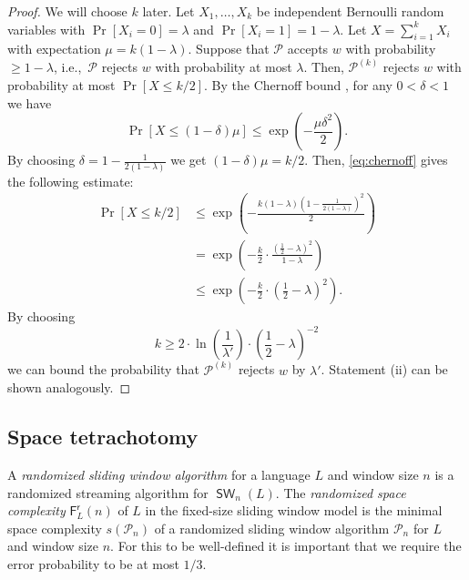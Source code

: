 \documentclass{article}\usepackage[a4paper,margin=20mm]{geometry}
\renewcommand{\P}{\mathcal{P}}
\newcommand{\F}{\mathsf{F}}
\renewcommand{\r}{\mathsf{r}}
\DeclareMathOperator{\SW}{\mathsf{SW}}
\renewcommand{\geq}{\geqslant}
\renewcommand{\leq}{\leqslant}
\renewcommand{\ge}{\geq}
\renewcommand{\le}{\leq}
\begin{document}
\begin{proof}
	We will choose $k$ later.
	Let $X_1, \dots, X_k$ be independent Bernoulli random variables
	with $\Pr[X_i = 0] = \lambda$ and $\Pr[X_i = 1] = 1-\lambda$.
	Let $X = \sum_{i=1}^k X_i$ with expectation $\mu = k (1-\lambda)$.
	Suppose that $\P$ accepts $w$ with probability $\ge 1-\lambda$,
	i.e.,~$\P$ rejects $w$ with probability at most $\lambda$.
	Then, $\P^{(k)}$ rejects $w$ with probability at most $\Pr[X \le k/2]$.
	By the Chernoff bound \cite[Theorem~4.5]{MitzenmacherU17},
	for any $0 < \delta < 1$ we have
	\begin{equation}
		\label{eq:chernoff}
		\Pr[X \le (1-\delta)\mu] \le \exp\left(-\frac{\mu\delta^2}{2}\right).
	\end{equation}
	By choosing $\delta = 1 - \frac{1}{2(1-\lambda)}$ we get $(1-\delta)\mu = k/2$.
	Then, \eqref{eq:chernoff} gives the following estimate:
	\begin{align*}
		 \Pr[X \le k/2] 
		&\le \exp\left(-\frac{k(1-\lambda)(1 - \frac{1}{2(1-\lambda)})^2}{2}\right) \\
		&= \exp\left(-\frac{k}{2}\cdot \frac{(\frac{1}{2}-\lambda)^2}{1-\lambda} \right) \\
		&\le \exp\left(-\frac{k}{2}\cdot \left(\frac{1}{2}-\lambda\right)^2 \right).
	\end{align*}
	By choosing
	\[
		k \ge 2 \cdot \ln \left( \frac{1}{\lambda'} \right) \cdot \left(\frac{1}{2}-\lambda\right)^{-2}
	\]
	we can bound the probability that $\P^{(k)}$ rejects $w$ by $\lambda'$.
	Statement (ii) can be shown analogously.
\end{proof}


\subsection{Space tetrachotomy}
A {\em randomized sliding window algorithm} for a language $L$ and window size $n$
is a randomized streaming algorithm for $\SW_n(L)$.
The {\em randomized space complexity} $\F^\r_L(n)$ of $L$ in the fixed-size sliding window model
is the minimal space complexity $s(\P_n)$ of a randomized sliding window algorithm
$\P_n$ for $L$ and window size $n$. For this to be well-defined it is important that we require the error
probability to be at most $1/3$.
\end{document}

